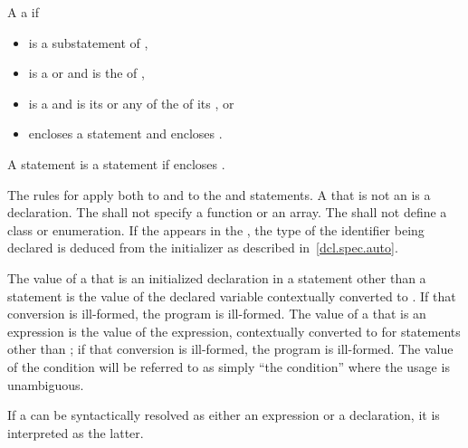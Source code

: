 \pnum
{}%
A   
a   if
\begin{itemize}
\item
   is a substatement of ,
\item
   is a  or
   and
   is the  of ,
\item
   is a  and 
  is its  or
  any of the  of
  its , or
\item
   encloses a statement  and  encloses .
\end{itemize}
%
A statement  is
a statement  if
 encloses .

\pnum
{}%
The rules for  apply both
to  and
to the  and  statements.
A  that is not an  is a
declaration.
The  shall not
specify a function or an array. The  shall not
define a class or enumeration. If the   appears in
the ,
the type of the identifier being declared is deduced from the initializer as described in~\ref{dcl.spec.auto}.

\pnum
The value of a  that is an initialized declaration
in a statement other than a  statement is the value of the
declared variable
contextually converted to .
If that
conversion is ill-formed, the program is ill-formed.
The value of a
 that is an expression is the value of the
expression, contextually converted to 
for statements other
than ;
if that conversion is ill-formed, the program is
ill-formed. The value of the condition will be referred to as simply
``the condition'' where the usage is unambiguous.

\pnum
If a  can be syntactically resolved
as either an expression or a declaration,
it is interpreted as the latter.

